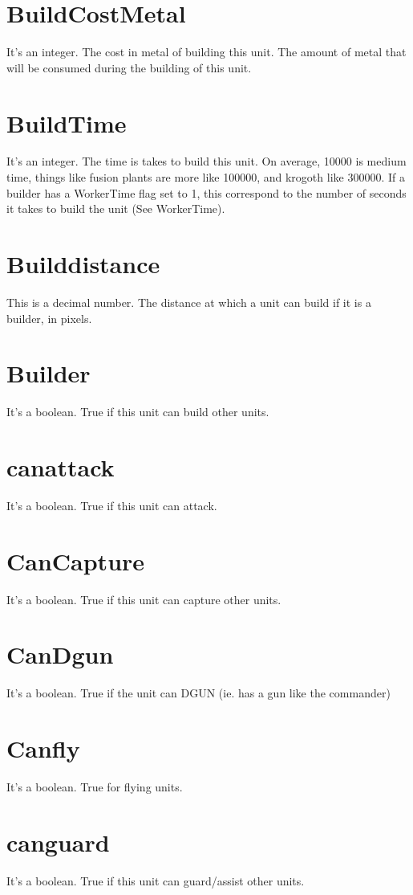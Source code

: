 \documentclass[a4paper,10pt]{article}
\begin{document}
\section{BuildCostMetal}
It's an integer. The cost in metal of building this unit.  The amount of metal that will be consumed during the building of this unit.

\section{BuildTime}
It's an integer. The time is takes to build this unit. On average, 10000 is medium time, things like fusion plants are more like 100000, and krogoth like 300000. If a builder has a WorkerTime flag set to 1, this correspond to the number of seconds it takes to build the unit (See WorkerTime).

\section{Builddistance}
This is a decimal number. The distance at which a unit can build if it is a builder, in pixels.

\section{Builder}
It's a boolean. True if this unit can build other units.

\section{canattack}
It's a boolean. True if this unit can attack.

\section{CanCapture}
It's a boolean. True if this unit can capture other units.

\section{CanDgun}
It's a boolean. True if the unit can DGUN (ie. has a gun like the commander)

\section{Canfly}
It's a boolean. True for flying units.

\section{canguard}
It's a boolean. True if this unit can guard/assist other units.
\end{document}

